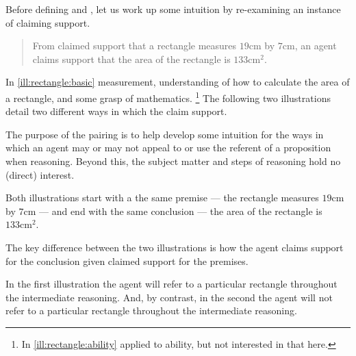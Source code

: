 \begin{note}[Illustration]
  Before defining \ur{} and \nr{}, let us work up some intuition by re-examining an instance of claiming support.

  \begin{quote}
    From claimed support that a rectangle measures \(19\text{cm}\) by \(7\text{cm}\), an agent claims support that the area of the rectangle is \(133\text{cm}^{2}\).
  \end{quote}
  In \autoref{ill:rectangle:basic} measurement, understanding of how to calculate the area of a rectangle, and some grasp of mathematics.\nolinebreak
  \footnote{
    In \autoref{ill:rectangle:ability} applied to ability, but not interested in that here.
  }
  The following two illustrations detail two different ways in which the claim support.

  The purpose of the pairing is to help develop some intuition for the ways in which an agent may or may not appeal to or use the referent of a proposition when reasoning.
  Beyond this, the subject matter and steps of reasoning hold no (direct) interest.

  Both illustrations start with a the same premise --- the rectangle measures \(19\text{cm}\) by \(7\text{cm}\) --- and end with the same conclusion --- the area of the rectangle is \(133\text{cm}^{2}\).

  The key difference between the two illustrations is how the agent claims support for the conclusion given claimed support for the premises.

  In the first illustration the agent will refer to a particular rectangle throughout the intermediate reasoning.
  And, by contrast, in the second the agent will not refer to a particular rectangle throughout the intermediate reasoning.
\end{note}

